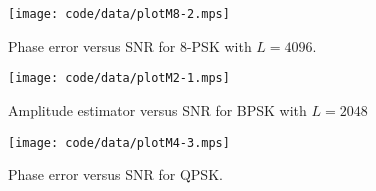 \documentclass[journal]{IEEEtran}
\begin{document}
\begin{figure}[p]
	\centering
		\texttt{[image: code/data/plotM8-2.mps]}
		\caption{Phase error versus SNR for $8$-PSK with $L=4096$.}
		\label{fig:plotphase8PSK}
\end{figure}



\begin{figure}[tp]
	\centering
		\texttt{[image: code/data/plotM2-1.mps]}
		\caption{Amplitude estimator versus SNR for BPSK with $L=2048$}
		\label{fig:plotampBPSK}
\end{figure}




\begin{figure}[tp]
	\centering
		\texttt{[image: code/data/plotM4-3.mps]}
		\caption{Phase error versus SNR for QPSK.}
		\label{fig:plotphaseQPSKmultL}
\end{figure}



\end{document}

